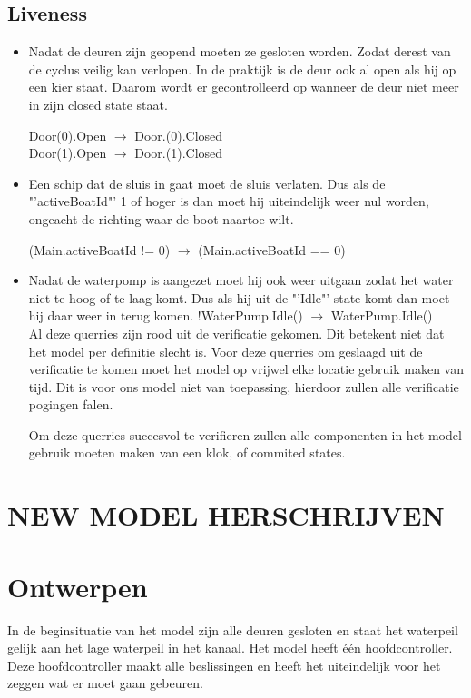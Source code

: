 \documentclass{article}
\begin{document}
\subsection{Liveness}
\begin{itemize}

\item Nadat de deuren zijn geopend moeten ze gesloten worden. Zodat derest van
de cyclus veilig kan verlopen. In de praktijk is de deur ook al open als hij op
een kier staat. Daarom wordt er gecontrolleerd op wanneer de deur niet meer
in zijn closed state staat.

{\center
Door(0).Open $\rightarrow$ Door.(0).Closed\\
Door(1).Open $\rightarrow$ Door.(1).Closed\\
}
\item Een schip dat de sluis in gaat moet de sluis verlaten. Dus als de "'activeBoatId"' 1 of hoger is dan moet hij uiteindelijk weer nul worden, ongeacht de richting waar de boot naartoe wilt.

{\center
(Main.activeBoatId != 0) $\rightarrow$ (Main.activeBoatId == 0)\\
}

\item Nadat de waterpomp is aangezet moet hij ook weer uitgaan zodat het water niet te hoog of te laag komt. Dus als hij uit de "'Idle"' state komt dan moet hij daar weer in terug komen.
{\center
!WaterPump.Idle() $\rightarrow$ WaterPump.Idle()\\
}
\vskip0.5cm
Al deze querries zijn {\color{red}rood} uit de verificatie gekomen. Dit betekent niet dat het model per definitie slecht is. Voor deze querries om geslaagd uit de verificatie te komen moet het model op vrijwel elke locatie gebruik maken van tijd. Dit is voor ons model niet van toepassing, hierdoor zullen alle verificatie pogingen falen.

Om deze querries succesvol te verifieren zullen alle componenten in het model gebruik moeten maken van een klok, of commited states.

\end{itemize}

\clearpage %
\section{\Large\color{red} \textbf{NEW MODEL HERSCHRIJVEN}}
\section{Ontwerpen} %
In de beginsituatie van het model zijn alle deuren gesloten en staat het waterpeil gelijk aan het lage waterpeil in het kanaal. Het model heeft één hoofdcontroller. Deze hoofdcontroller maakt alle beslissingen en heeft het uiteindelijk voor het zeggen wat er moet gaan gebeuren.
\end{document}
